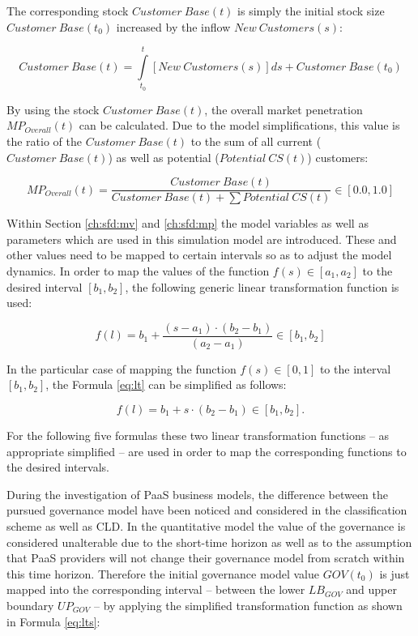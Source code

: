 The corresponding stock $Customer~Base(t)$ is simply the initial stock size $\mathit{Customer~Base(t_0)}$ increased by the inflow $New~Customers(s)$:

\begin{equation}\label{eq:cb}
	\mathit{Customer~Base(t)} = \int\limits_{t_0}^t \mathit{[New~Customers(s)]ds} + \mathit{Customer~Base(t_0)}
\end{equation}

By using the stock $Customer~Base(t)$, the overall market penetration $MP_{Overall}(t)$ can be calculated. Due to the model simplifications, this value is the ratio of the $Customer~Base(t)$ to the sum of all current \linebreak ($Customer~Base(t)$) as well as potential ($Potential~CS(t)$) customers:

\begin{equation}\label{eq:mpo}
	MP_{Overall}(t) = \frac{\mathit{Customer~Base(t)}}{\mathit{Customer~Base(t)} + \sum \mathit{Potential~CS(t)}} \in [0.0,1.0]
\end{equation}

Within Section \ref{ch:sfd:mv} and \ref{ch:sfd:mp} the model variables as well as parameters which are used in this simulation model are introduced. These and other values need to be mapped to certain intervals so as to adjust the model dynamics. In order to map the values of the function $f(s) \in [a_1,a_2]$ to the desired interval $[b_1,b_2]$, the following generic linear transformation function is used:

\begin{equation}\label{eq:lt}
	f(l) = b_{1} + \frac{(s-a_1) \cdot (b_2-b_1)}{(a_2-a_1)} \in [b_1,b_2]
\end{equation}

In the particular case of mapping the function $f(s) \in [0,1]$ to the interval $[b_1,b_2]$, the Formula \ref{eq:lt} can be simplified as follows:

\begin{equation}\label{eq:lts}
	f(l) = b_{1} + s \cdot (b_{2}-b_{1}) \in [b_{1},b_{2}].
\end{equation}

For the following five formulas these two linear transformation functions -- as appropriate simplified -- are used in order to map the corresponding functions to the desired intervals.

During the investigation of \ac{PaaS} business models, the difference between the pursued governance model have been noticed and considered in the classification scheme as well as \ac{CLD}. In the quantitative model the value of the governance is considered unalterable due to the short-time horizon as well as to the assumption that \ac{PaaS} providers will not change their governance model from scratch within this time horizon. Therefore the initial governance model value $GOV(t_0)$ is just mapped into the corresponding interval -- between the lower $LB_{GOV}$ and upper boundary $UP_{GOV}$ -- by applying the simplified transformation function as shown in Formula \ref{eq:lts}:

